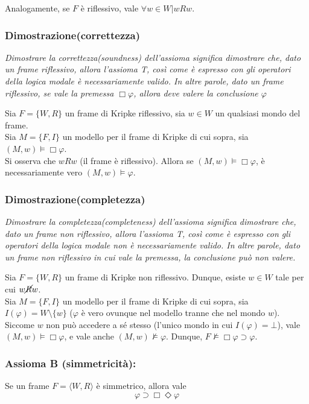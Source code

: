 Analogamente, se $F$ è riflessivo, vale $\forall w \in W | wRw$.

\subsubsection{Dimostrazione(correttezza)}
\textit{Dimostrare la correttezza(soundness) dell'assioma significa dimostrare che, dato un frame riflessivo, allora l'assioma T, così come è espresso con gli operatori della logica modale è necessariamente valido. In altre parole, dato un frame riflessivo, se vale la premessa $\Box \varphi$, allora deve valere la conclusione $\varphi$}

Sia $F = \lbrace W, R \rbrace$ un frame di Kripke riflessivo, sia $w \in W$ un qualsiasi mondo del frame.\\
Sia $M = \lbrace F, I \rbrace$ un modello per il frame di Kripke di cui sopra, sia $(M, w) \models \Box \varphi$.\\
Si osserva che $wRw$ (il frame è riflessivo). Allora se $(M, w) \models \Box \varphi$, è necessariamente vero $(M, w) \models \varphi$.

\subsubsection{Dimostrazione(completezza)}
\textit{Dimostrare la completezza(completeness) dell'assioma significa dimostrare che, dato un frame non riflessivo, allora l'assioma T, così come è espresso con gli operatori della logica modale non è necessariamente valido. In altre parole, dato un frame non riflessivo in cui vale la premessa, la conclusione può non valere.}

Sia $F = \lbrace W, R \rbrace$ un frame di Kripke non riflessivo. Dunque, esiste $w \in W$ tale per cui $w\cancel{R}w$.\\
Sia $M = \lbrace F, I \rbrace$ un modello per il frame di Kripke di cui sopra, sia $I(\varphi) = W \setminus \{w\}$ ($\varphi$ è vero ovunque nel modello tranne che nel mondo $w$).\\
Siccome $w$ non può accedere a sé stesso (l'unico mondo in cui $I(\varphi) = \bot$), vale $(M, w) \models \Box \varphi$, e vale anche $(M, w) \not \models \varphi$. Dunque, $F \not \models \Box \varphi \supset \varphi$.
\\

\subsubsection{Assioma B (simmetricità):} Se un frame $F = \langle W, R \rangle$ è simmetrico, allora vale $$\varphi \supset \Box \Diamond \varphi$$

